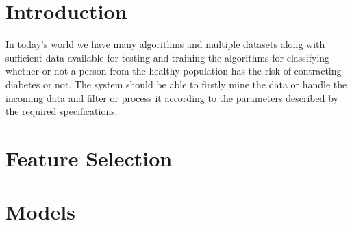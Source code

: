 \documentclass[12pt]{article}
\begin{document}
\section{Introduction}
In today's world we have many algorithms and multiple datasets along with sufficient data available for testing and training the algorithms for classifying whether or not a person from the healthy population has the risk of contracting diabetes or not. The system should be able to firstly mine the data or handle the incoming data and filter or process it according to the parameters described by the required specifications.


\section{Feature Selection}
\newpage
\section{Models}
\end{document}
